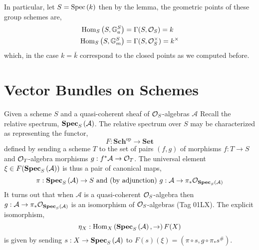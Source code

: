\documentclass[12pt]{article}
\begin{document}
\begin{remark}
In particular, let $S = \mathrm{Spec}\left( k \right)$ then by the lemma, the geometric points of these group schemes are,
\begin{align*}
\mathrm{Hom}_{S} \left( S, \mathbb{G}_a^S \right) & = \Gamma(S, \mathcal{O}_{S}) = k
\\
\mathrm{Hom}_{S} \left( S, \mathbb{G}_m^S \right) & = \Gamma(S, \mathcal{O}_{S}^\times) = k^\times
\end{align*}
which, in the case $k = \bar{k}$ correspond to the closed points as we computed before.
\end{remark}

\section{Vector Bundles on Schemes}

\newcommand{\cA}{\mathcal{A}}

\begin{remark}
Given a scheme $S$ and a quasi-coherent sheaf of $\mathcal{O}_{S}$-algebras $\cA$ Recall the relative spectrum, $\rSpec{S}{\cA}$.
The relative spectrum over $S$ may be characterized as representing the functor,
\[ F : \mathbf{Sch}^{\text{op}} \to \mathbf{Set} \]
defined by sending a scheme $T$ to the set of pairs $(f, g)$ of morphisms $f : T \to S$ and $\mathcal{O}_{T}$-algebra morphisms $g : f^* \cA \to \struct{T}$. The universal element $\xi \in F(\rSpec{S}{\cA})$ is thus a pair of canonical maps,
\[ \pi : \rSpec{S}{\cA} \to S \text{ and (by adjunction) } g : \cA \to \pi_* \struct{\rSpec{S}{\cA}} \]
It turns out that when $\cA$ is a quasi-coherent $\mathcal{O}_{S}$-algebra then $g : \cA \to \pi_* \struct{\rSpec{S}{\cA}}$ is an isomorphism of $\mathcal{O}_{S}$-algebras (Tag 01LX). The explicit isomorphism,
\[ \eta_X : \mathrm{Hom}_{X} \left( \mathbf{Spec}_{S}\left( \mathcal{A} \right), \to \right) F(X) \]
is given by sending $s : X \to \mathbf{Spec}_{S}\left( \mathcal{A} \right)$ to $F(s)(\xi) = (\pi \circ s, g \circ \pi_* s^\#)$.
\end{remark}
\end{document}

